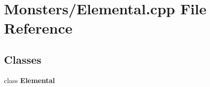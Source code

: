 \section{Monsters/\-Elemental.cpp File Reference}
\label{_elemental_8cpp}
\subsection*{Classes}
\begin{DoxyCompactItemize}
\item 
class {\bf Elemental}
\end{DoxyCompactItemize}
